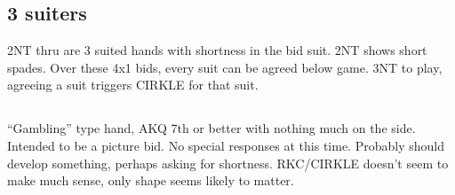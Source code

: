 \documentclass[tom-ari]{subfile}
\begin{document}
	\subsection{3 suiters}
	
	2NT thru  are 3 suited hands with shortness in the bid suit. 2NT shows short spades. Over these 4x1 bids, every suit can be agreed below game. 3NT to play, agreeing a suit triggers CIRKLE for that suit.
	
	\subsection[3S]{}
	
	``Gambling'' type hand, AKQ 7th or better with nothing much on the side. Intended to be a picture bid. No special responses at this time. Probably should develop something, perhaps  asking for shortness. RKC/CIRKLE doesn't seem to make much sense, only shape seems likely to matter.
\end{document}
